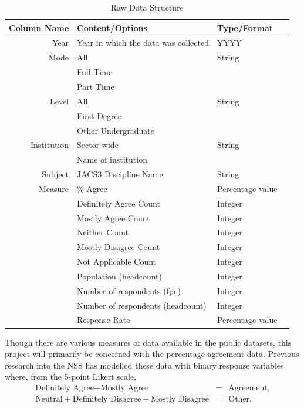 \documentclass[11pt,a4paper]{report}
\begin{document}
\begin{table}[ht]
	\centering
	\caption{Raw Data Structure}
	\begin{tabular}{rlll}
		\hline
		\hline
		Column Name & Content/Options & Type/Format\\[0.2cm]
\hline
		Year & Year in which the data was collected & YYYY \\[0.3cm]

		Mode & All & String \\
		& Full Time & \\
		& Part Time & \\[0.3cm]

		Level & All & String \\
		& First Degree & \\
		& Other Undergraduate & \\[0.3cm]

		Institution & Sector wide & String \\
		& Name of institution & \\[0.3cm]

		Subject & JACS3 Discipline Name & String\\[0.3cm]

		Measure & \% Agree & Percentage value \\
		& Definitely Agree Count & Integer \\
		& Mostly Agree Count & Integer \\
		& Neither Count & Integer \\
		& Mostly Disagree Count & Integer \\
		& Not Applicable Count & Integer \\
		& Population (headcount) & Integer \\
		& Number of respondents (fpe) & Integer \\
		& Number of respondents (headcount) & Integer \\
		& Response Rate & Percentage value\\
		\hline
		\hline		

	\end{tabular}

	\label{table:rawdatastructure}
\end{table}

\newpage
Though there are various measures of data available in the public datasets, this project will primarily be concerned with the percentage agreement data. Previous research into the \ac{NSS} \cite{fielding2010sciencesubjects, hewson2011preliminary} has modelled these data with binary response variables where, from the 5-point Likert scale,
\begin{eqnarray}
\text{Definitely Agree} + \text{Mostly Agree} &=& \text{Agreement}, \label{eq1} \\
\text{Neutral} + \text{Definitely Disagree} + \text{Mostly Disagree} &=& \text{Other}. \label{eq2}
\end{eqnarray}
\end{document}
